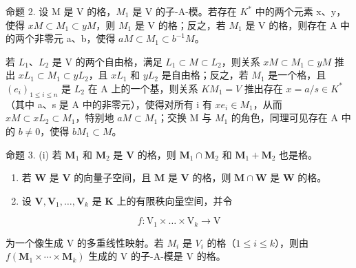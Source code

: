 命题 2. 设 M 是 V 的格，\(M_{1}\) 是 V 的子-A-模。若存在 \(K^{*}\) 中的两个元素 x、y，使得 \(xM \subset M_{1} \subset yM\)，则 \(M_{1}\) 是 V 的格；反之，若 \(M_{1}\) 是 V 的格，则存在 A 中的两个非零元 a、b，使得 \(aM \subset M_{1} \subset b^{-1}M\)。

若 \(L_{1}\)、\(L_{2}\) 是 V 的两个自由格，满足 \(L_{1} \subset M \subset L_{2}\)，则关系 \(xM \subset M_{1} \subset yM\) 推出 \(xL_{1} \subset M_{1} \subset yL_{2}\)，且 \(xL_{1}\) 和 \(yL_{2}\) 是自由格；反之，若 \(M_{1}\) 是一个格，且 \((e_{i})_{1 \leqslant i \leqslant n}\) 是 \(L_{2}\) 在 A 上的一个基，则关系 \(KM_{1} = V\) 推出存在 \(x = a/s \in K^{*}\)（其中 a、s 是 A 中的非零元），使得对所有 i 有 \(xe_{i} \in M_{1}\)，从而 \(xM \subset xL_{2} \subset M_{1}\)，特别地 \(aM \subset M_{1}\)；交换 M 与 \(M_{1}\) 的角色，同理可见存在 A 中的 \(b \neq 0\)，使得 \(bM_{1} \subset M\)。

命题 3. (i) 若 \(\mathbf{M}_1\) 和 \(\mathbf{M}_2\) 是 \(\mathbf{V}\) 的格，则 \(\mathbf{M}_1 \cap \mathbf{M}_2\) 和 \(\mathbf{M}_1 + \mathbf{M}_2\) 也是格。

\begin{enumerate}
\def\labelenumi{(\roman{enumi})}
\setcounter{enumi}{1}
\item
  若 \(\mathbf{W}\) 是 \(\mathbf{V}\) 的向量子空间，且 \(\mathbf{M}\) 是 \(\mathbf{V}\) 的格，则 \(\mathbf{M} \cap \mathbf{W}\) 是 \(\mathbf{W}\) 的格。
\item
  设 \(\mathbf{V},\mathbf{V}_1,\ldots ,\mathbf{V}_k\) 是 \(\mathbf{K}\) 上的有限秩向量空间，并令
\end{enumerate}

\[
f \colon \mathrm{V} _ {1} \times \dots \times \mathrm{V} _ {k} \rightarrow \mathrm{V}
\]

为一个像生成 V 的多重线性映射。若 \(M_{i}\) 是 \(V_{i}\) 的格（\(1 \leqslant i \leqslant k\)），则由 \(f(\mathbf{M}_{1} \times \cdots \times \mathbf{M}_{k})\) 生成的 V 的子-A-模是 V 的格。

